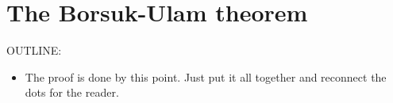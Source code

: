\documentclass{amsart}
\begin{document}
\section{The Borsuk-Ulam theorem}
\label{sec:borsuk-ulam}

OUTLINE:
\begin{itemize}
\item
  The proof is done by this point. Just put it all
  together and reconnect the dots for the reader.
\end{itemize}



\nocite{shul:bfp,brunerie:thesis,br:rp-hott}

\end{document}
